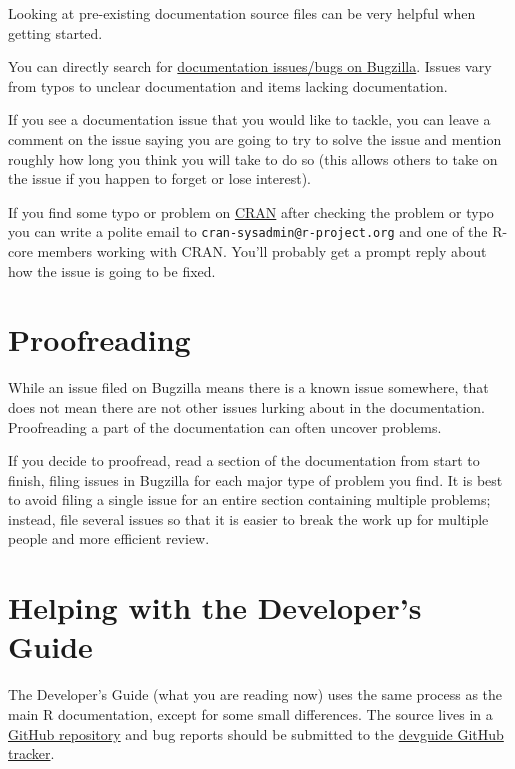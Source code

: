 \documentclass[
]{book}
\begin{document}
Looking at pre-existing documentation source files can be very helpful when getting started.

You can directly search for \href{https://bugs.r-project.org/buglist.cgi?component=Documentation&list_id=22501&product=R&resolution=---}{documentation issues/bugs on Bugzilla}. Issues vary from typos to unclear documentation and items lacking documentation.

If you see a documentation issue that you would like to tackle, you can leave a comment on the issue saying you are going to try to solve the issue and mention roughly how long you think you will take to do so (this allows others to take on the issue if you happen to forget or lose interest).

If you find some typo or problem on \href{https://cran.r-project.org}{CRAN} after checking the problem or typo you can write a polite email to \texttt{cran-sysadmin@r-project.org} and one of the R-core members working with CRAN. You'll probably get a prompt reply about how the issue is going to be fixed.

\section{Proofreading}\label{proofreading}

While an issue filed on Bugzilla means there is a known issue somewhere, that does not mean there are not other issues lurking about in the documentation. Proofreading a part of the documentation can often uncover problems.

If you decide to proofread, read a section of the documentation from start to finish, filing issues in Bugzilla for each major type of problem you find. It is best to avoid filing a single issue for an entire section containing multiple problems; instead, file several issues so that it is easier to break the work up for multiple people and more efficient review.

\section{Helping with the Developer's Guide}\label{helping-with-the-developers-guide}

The Developer's Guide (what you are reading now) uses the same process as the main R documentation, except for some small differences. The source lives in a \href{https://github.com/r-devel/rdevguide/}{GitHub repository} and bug reports should be submitted to the \href{https://github.com/r-devel/rdevguide/issues}{devguide GitHub tracker}.
\end{document}

